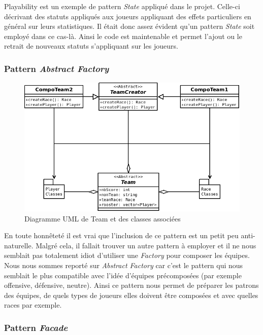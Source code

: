 \documentclass{article}
\newcommand{\pattern}{\emph}
\begin{document}
            Playability est un exemple de pattern \pattern{State} appliqué dans le projet. Celle-ci décrivant des statuts appliqués aux joueurs appliquant des effets particuliers en général sur leurs statistiques. Il était donc assez évident qu'un pattern \pattern{State} soit employé dans ce cas-là. Ainsi le code est maintenable et permet l'ajout ou le retrait de nouveaux statuts s'appliquant sur les joueurs.
        
        \subsubsection{Pattern \pattern{Abstract Factory}}
        
            \begin{figure}[H]
                \centerline{\includegraphics[scale=0.5]{img/Team.png}}
                \caption{\label{DiaTeam} Diagramme UML de Team et des classes associées}
            \end{figure}
        
            En toute honnêteté il est vrai que l'inclusion de ce pattern est un petit peu anti-naturelle. Malgré cela, il fallait trouver un autre pattern à employer et il ne nous semblait pas totalement idiot d'utiliser une \pattern{Factory} pour composer les équipes. Nous nous sommes reporté sur \pattern{Abstract Factory} car c'est le pattern qui nous semblait le plus compatible avec l'idée d'équipes précomposées (par exemple offensive, défensive, neutre). Ainsi ce pattern nous permet de préparer les patrons des équipes, de quels types de joueurs elles doivent être composées et avec quelles races par exemple.
        
        \subsubsection{Pattern \pattern{Facade}}
        
\end{document}
